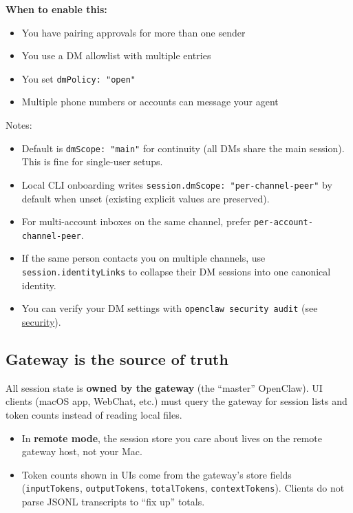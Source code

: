 \textbf{When to enable this:}

\begin{itemize}
  \item You have pairing approvals for more than one sender
  \item You use a DM allowlist with multiple entries
  \item You set \texttt{dmPolicy: "open"}
  \item Multiple phone numbers or accounts can message your agent
\end{itemize}


Notes:

\begin{itemize}
  \item Default is \texttt{dmScope: "main"} for continuity (all DMs share the main session). This is fine for single-user setups.
  \item Local CLI onboarding writes \texttt{session.dmScope: "per-channel-peer"} by default when unset (existing explicit values are preserved).
  \item For multi-account inboxes on the same channel, prefer \texttt{per-account-channel-peer}.
  \item If the same person contacts you on multiple channels, use \texttt{session.identityLinks} to collapse their DM sessions into one canonical identity.
  \item You can verify your DM settings with \texttt{openclaw security audit} (see \href{/cli/security}{security}).
\end{itemize}


\subsection{Gateway is the source of truth}


All session state is \textbf{owned by the gateway} (the “master” OpenClaw). UI clients (macOS app, WebChat, etc.) must query the gateway for session lists and token counts instead of reading local files.

\begin{itemize}
  \item In \textbf{remote mode}, the session store you care about lives on the remote gateway host, not your Mac.
  \item Token counts shown in UIs come from the gateway’s store fields (\texttt{inputTokens}, \texttt{outputTokens}, \texttt{totalTokens}, \texttt{contextTokens}). Clients do not parse JSONL transcripts to “fix up” totals.
\end{itemize}


